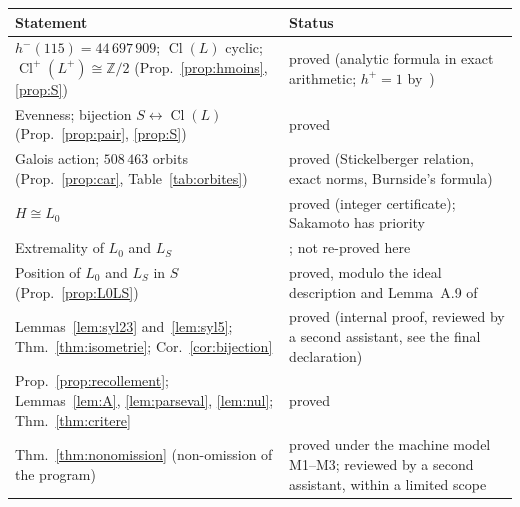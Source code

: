 \documentclass[11pt,a4paper]{amsart}
\theoremstyle{plain}
\theoremstyle{definition}
\numberwithin{equation}{section}
\newcommand{\Z}{\mathbb{Z}}
\DeclareMathOperator{\Cl}{Cl}
\newcommand{\Clp}{\Cl^{+}}
\newcommand{\Lz}{L_{0}}
\newcommand{\LS}{L_{S}}
\begin{document}
\begin{center}\small\renewcommand{\arraystretch}{1.25}
\begin{tabular}{>{\raggedright\arraybackslash}p{7.3cm}>{\raggedright\arraybackslash}p{6.9cm}}
\toprule
Statement & Status \\
\midrule
$h^-(115)=44\,697\,909$; $\Cl(L)$ cyclic; $\Clp(L^+)\cong\Z/2$ (Prop.~\ref{prop:hmoins}, \ref{prop:S}) & proved (analytic formula in exact arithmetic; $h^+=1$ by~\cite{Mil14}) \\
Evenness; bijection $S\leftrightarrow\Cl(L)$ (Prop.~\ref{prop:pair}, \ref{prop:S}) & proved \\
Galois action; $508\,463$ orbits (Prop.~\ref{prop:car}, Table~\ref{tab:orbites}) & proved (Stickelberger relation, exact norms, Burnside's formula) \\
$H\cong\Lz$ & proved (integer certificate); Sakamoto has priority \\
Extremality of $\Lz$ and $\LS$ & \cite[Prop.~5.5 and \S5]{Sak26}; not re-proved here \\
Position of $\Lz$ and $\LS$ in $S$ (Prop.~\ref{prop:L0LS}) & proved, modulo the ideal description and Lemma~A.9 of~\cite{Sak26} \\
Lemmas~\ref{lem:syl23} and~\ref{lem:syl5}; Thm.~\ref{thm:isometrie}; Cor.~\ref{cor:bijection} & proved (internal proof, reviewed by a second assistant, see the final declaration) \\
Prop.~\ref{prop:recollement}; Lemmas~\ref{lem:A}, \ref{lem:parseval}, \ref{lem:nul}; Thm.~\ref{thm:critere} & proved \\
Thm.~\ref{thm:nonomission} (non-omission of the program) & proved under the machine model M1--M3; reviewed by a second assistant, within a limited scope \\
\bottomrule
\end{tabular}


\end{center}
\end{document}
